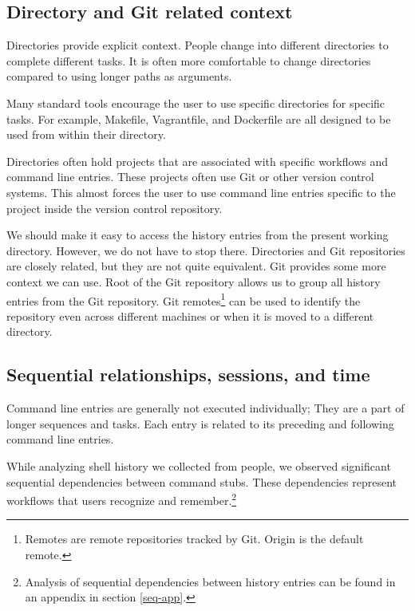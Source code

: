 \subsection{Directory and Git related context}

Directories provide explicit context. People change into different directories to complete different tasks.\cite{greenberg1993computer} It is often more comfortable to change directories compared to using longer paths as arguments. 

Many standard tools encourage the user to use specific directories for specific tasks. 
For example, Makefile, Vagrantfile, and Dockerfile are all designed to be used from within their directory\cite{man-make}\cite{docs-vagrantfile}\cite{docs-dockerfile}. 

Directories often hold projects that are associated with specific workflows and command line entries. 
These projects often use Git or other version control systems. This almost forces the user to use command line entries specific to the project inside the version control repository. 

We should make it easy to access the history entries from the present working directory.
However, we do not have to stop there. Directories and Git repositories are closely related, but they are not quite equivalent. Git provides some more context we can use. 
Root of the Git repository allows us to group all history entries from the Git repository.
Git remotes\footnote{Remotes are remote repositories tracked by Git. Origin is the default remote.} can be used to identify the repository even across different machines or when it is moved to a different directory. 




\subsection{Sequential relationships, sessions, and time}

Command line entries are generally not executed individually; They are a part of longer sequences and tasks.\cite{greenberg1993computer} Each entry is related to its preceding and following command line entries. 

While analyzing shell history we collected from people, we observed significant sequential dependencies between command stubs. These dependencies represent workflows that users recognize and remember.\footnote{Analysis of sequential dependencies between history entries can be found in an appendix in section \ref{seq-app}.}

